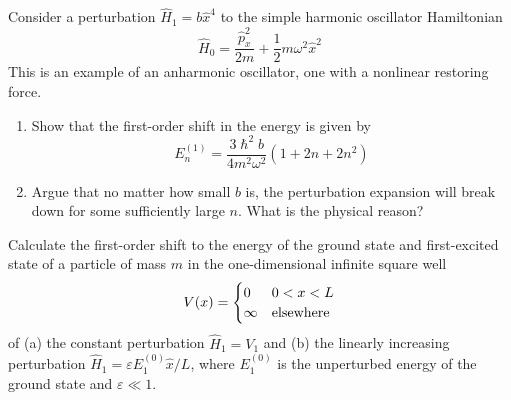 \documentclass[11pt]{hmcpset}
\begin{document}
\begin{problem}

Consider a perturbation $\hat{H}_{1} = b\hat{x}^{4}$ to the
simple harmonic oscillator Hamiltonian
\[
\hat{H}_0 = \frac{\hat{p}_x^2}{2m} + \frac{1}{2} m\omega^2 \hat{x}^2
\]
This is an example of an anharmonic oscillator, one with a nonlinear
restoring force.
\begin{enumerate}
	\item[(a)] Show that the first-order shift in the energy is given by
	\[
	E_{n}^{(1)} = {\frac{{3\hslash ^{2}b}}{{4m^{2}\omega^{2}}}} ( {1 + 2n + 2n^{2}})
	\]
	\item[(b)] Argue that no matter how small $b $ is, the perturbation expansion will break
	down for some sufficiently large $n$. What is the physical reason?
\end{enumerate}


\end{problem}
\begin{solution}
	\vfill
\end{solution}
	\pagebreak
	


\begin{problem}

Calculate the first-order shift to the energy of the ground
state and first-excited state of a particle of mass $m$ in the one-dimensional
infinite square well
\[
V( {x} ) = {{{\begin{cases}
			{0}  & {0 < x < L}  \\
			{\infty }  & {\rm elsewhere}  \\
			\end{cases} }} }
\]
of (a) the constant perturbation $\hat{H}_{1} = V_{1}$ and (b) the linearly
increasing perturbation $\hat{H}_{1} = \varepsilon E_{1}^{(0)} \hat{x}/L$,
where $E_{1}^{(0)}$ is the unperturbed energy of the ground state and $\varepsilon \ll 1$.

\end{problem}
\begin{solution}
	\vfill
\end{solution}
	\pagebreak
	

\end{document}

